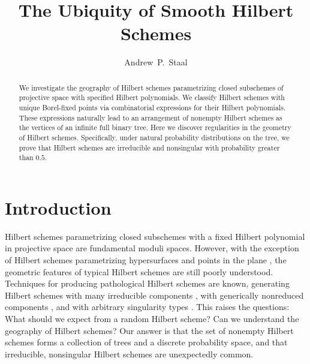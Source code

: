 \documentclass[12pt]{amsart}%
\theoremstyle{definition}%
\begin{document}
\begin{abstract}
  We investigate the geography of Hilbert schemes parametrizing closed
  subschemes of projective space with specified Hilbert polynomials.
  We classify Hilbert schemes with unique Borel-fixed points via
  combinatorial expressions for their Hilbert polynomials.  These
  expressions naturally lead to an arrangement of nonempty Hilbert
  schemes as the vertices of an infinite full binary tree.  Here we
  discover regularities in the geometry of Hilbert schemes.
  Specifically, under natural probability distributions on the tree,
  we prove that Hilbert schemes are irreducible and nonsingular with
  probability greater than $0.5$.
\end{abstract}


\title{The Ubiquity of Smooth Hilbert Schemes}
\author{Andrew~P.~Staal}%
\address{ Department of Pure Mathematics \\
  University of Waterloo \\
  200 University Avenue West \\
  Waterloo, Ontario, Canada, N2L 3G1 }%
\date{}
\maketitle


\section{Introduction}

Hilbert schemes parametrizing closed subschemes with a fixed Hilbert
polynomial in projective space are fundamental moduli spaces.
However, with the exception of Hilbert schemes parametrizing
hypersurfaces \cite[Example~2.3]{Arbarello--Cornalba--Griffiths--2011}
and points in the plane \cite{Fogarty--1968}, the geometric features
of typical Hilbert schemes are still poorly understood.  Techniques
for producing pathological Hilbert schemes are known, generating
Hilbert schemes with many irreducible components
\cite{Iarrobino--1972, Fantechi--Pardini--1996}, with generically
nonreduced components \cite{Mumford--1962}, and with arbitrary
singularity types \cite{Vakil--2006}.  This raises the questions: What
should we expect from a random Hilbert scheme?  Can we understand the
geography of Hilbert schemes?  Our answer is that the set of nonempty
Hilbert schemes forms a collection of trees and a discrete probability
space, and that irreducible, nonsingular Hilbert schemes are
unexpectedly common.
\end{document}
